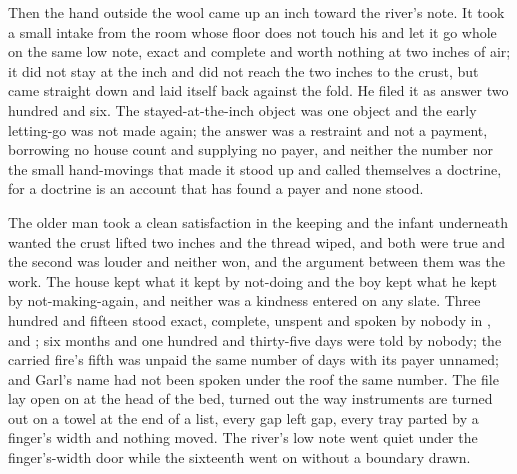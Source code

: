 Then the hand outside the wool came up an inch toward the river's note. It took a small intake from the room whose floor does not touch his and let it go whole on the same low note, exact and complete and worth nothing at two inches of air; it did not stay at the inch and did not reach the two inches to the crust, but came straight down and laid itself back against the fold. He filed it as answer two hundred and six. The stayed-at-the-inch object was one object and the early letting-go was not made again; the answer was a restraint and not a payment, borrowing no house count and supplying no payer, and neither the number nor the small hand-movings that made it stood up and called themselves a doctrine, for a doctrine is an account that has found a payer and none stood.

The older man took a clean satisfaction in the keeping and the infant underneath wanted the crust lifted two inches and the thread wiped, and both were true and the second was louder and neither won, and the argument between them was the work. The house kept what it kept by not-doing and the boy kept what he kept by not-making-again, and neither was a kindness entered on any slate. Three hundred and fifteen stood exact, complete, unspent and spoken by nobody in ,  and ; six months and one hundred and thirty-five days were told by nobody; the carried fire's fifth was unpaid the same number of days with its payer unnamed; and Garl's name had not been spoken under the roof the same number. The file lay open on  at the head of the bed, turned out the way instruments are turned out on a towel at the end of a list, every gap left gap, every tray parted by a finger's width and nothing moved. The river's low note went quiet under the finger's-width door while the sixteenth went on without a boundary drawn.
